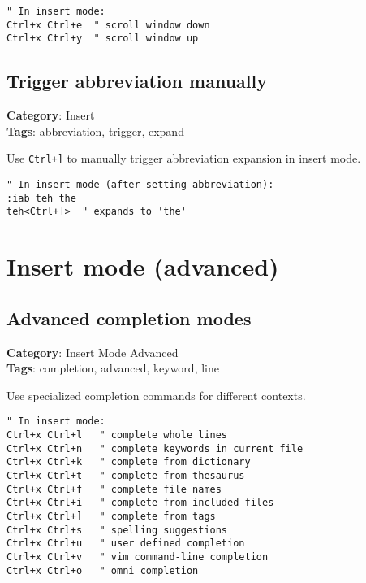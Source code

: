 {{{{{{\begin{Exa*}{}
\begin{Verbatim}[fontsize=\footnotesize, breaklines, breakanywhere]
" In insert mode:
Ctrl+x Ctrl+e  " scroll window down
Ctrl+x Ctrl+y  " scroll window up
\end{Verbatim}
\end{Exa*}

\section{Trigger abbreviation manually}

\textbf{Category}: Insert\\ \textbf{Tags}: abbreviation, trigger, expand
\vspace{0.5cm}

Use {\footnotesize \Verb§Ctrl+]§} to manually trigger abbreviation expansion in insert mode.

\begin{Exa*}{}
\begin{Verbatim}[fontsize=\footnotesize, breaklines, breakanywhere]
" In insert mode (after setting abbreviation):
:iab teh the
teh<Ctrl+]>  " expands to 'the'
\end{Verbatim}
\end{Exa*}

\chapter{Insert mode (advanced)}
\section{Advanced completion modes}

\textbf{Category}: Insert Mode Advanced\\ \textbf{Tags}: completion, advanced, keyword, line
\vspace{0.5cm}

Use specialized completion commands for different contexts.

\begin{Exa*}{}
\begin{Verbatim}[fontsize=\footnotesize, breaklines, breakanywhere]
" In insert mode:
Ctrl+x Ctrl+l   " complete whole lines
Ctrl+x Ctrl+n   " complete keywords in current file
Ctrl+x Ctrl+k   " complete from dictionary
Ctrl+x Ctrl+t   " complete from thesaurus
Ctrl+x Ctrl+f   " complete file names
Ctrl+x Ctrl+i   " complete from included files
Ctrl+x Ctrl+]   " complete from tags
Ctrl+x Ctrl+s   " spelling suggestions
Ctrl+x Ctrl+u   " user defined completion
Ctrl+x Ctrl+v   " vim command-line completion
Ctrl+x Ctrl+o   " omni completion
\end{Verbatim}
\end{Exa*}

}}}}}}
